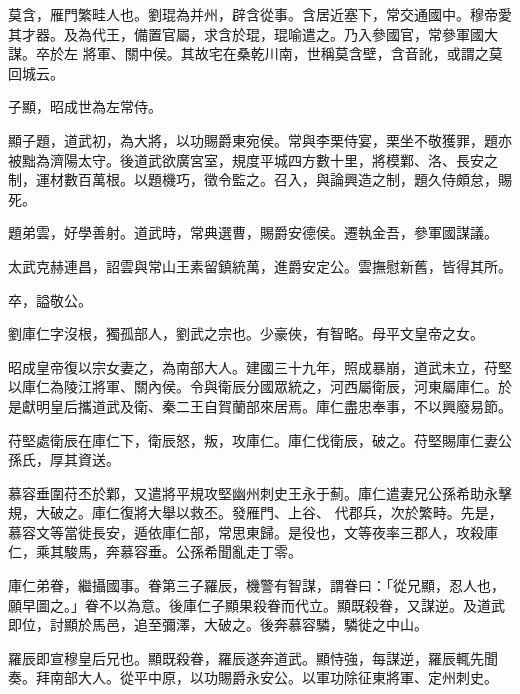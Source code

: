 \begin{pinyinscope}
 莫含，雁門繁畦人也。劉琨為并州，辟含從事。含居近塞下，常交通國中。穆帝愛其才器。及為代王，備置官屬，求含於琨，琨喻遣之。乃入參國官，常參軍國大謀。卒於左
 將軍、關中侯。其故宅在桑乾川南，世稱莫含壁，含音訛，或謂之莫回城云。



 子顯，昭成世為左常侍。



 顯子題，道武初，為大將，以功賜爵東宛侯。常與李栗侍宴，栗坐不敬獲罪，題亦被黜為濟陽太守。後道武欲廣宮室，規度平城四方數十里，將模鄴、洛、長安之制，運材數百萬根。以題機巧，徵令監之。召入，與論興造之制，題久侍頗怠，賜死。



 題弟雲，好學善射。道武時，常典選曹，賜爵安德侯。遷執金吾，參軍國謀議。



 太武克赫連昌，詔雲與常山王素留鎮統萬，進爵安定公。雲撫慰新舊，皆得其所。



 卒，謚敬公。



 劉庫仁字沒根，獨孤部人，劉武之宗也。少豪俠，有智略。母平文皇帝之女。



 昭成皇帝復以宗女妻之，為南部大人。建國三十九年，照成暴崩，道武未立，苻堅以庫仁為陵江將軍、關內侯。令與衛辰分國眾統之，河西屬衛辰，河東屬庫仁。於是獻明皇后攜道武及衛、秦二王自賀蘭部來居焉。庫仁盡忠奉事，不以興廢易節。



 苻堅處衛辰在庫仁下，衛辰怒，叛，攻庫仁。庫仁伐衛辰，破之。苻堅賜庫仁妻公孫氏，厚其資送。



 慕容垂圍苻丕於鄴，又遣將平規攻堅幽州刺史王永于薊。庫仁遣妻兄公孫希助永擊規，大破之。庫仁復將大舉以救丕。發雁門、上谷、
 代郡兵，次於繁畤。先是，慕容文等當徙長安，遁依庫仁部，常思東歸。是役也，文等夜率三郡人，攻殺庫仁，乘其駿馬，奔慕容垂。公孫希聞亂走丁零。



 庫仁弟眷，繼攝國事。眷第三子羅辰，機警有智謀，謂眷曰：「從兄顯，忍人也，願早圖之。」眷不以為意。後庫仁子顯果殺眷而代立。顯既殺眷，又謀逆。及道武即位，討顯於馬邑，追至彌澤，大破之。後奔慕容驎，驎徙之中山。



 羅辰即宣穆皇后兄也。顯既殺眷，羅辰遂奔道武。顯恃強，每謀逆，羅辰輒先聞奏。拜南部大人。從平中原，以功賜爵永安公。以軍功除征東將軍、定州刺史。




\end{pinyinscope}
